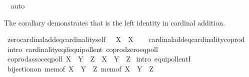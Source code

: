\begin{isabellebody}
\ \ auto%
\endisatagproof
{\isafoldproof}%
%
\isadelimproof
%
\endisadelimproof
%
\begin{isamarkuptext}%
The corallary demonstrates that  is the left identity in cardinal addition.%
\end{isamarkuptext}\isamarkuptrue%
\isamarkupfalse%
\ zero{\isacharunderscore}{\kern0pt}cardinal{\isacharunderscore}{\kern0pt}add{\isacharunderscore}{\kern0pt}eq{\isacharunderscore}{\kern0pt}cardinality{\isacharunderscore}{\kern0pt}self{\isacharcolon}{\kern0pt}\ {\isachardoublequoteopen}{}\ {\isasymoplus}\ X\ {\isacharequal}{\kern0pt}\ {\isacharbar}{\kern0pt}X{\isacharbar}{\kern0pt}{\isachardoublequoteclose}\isanewline
%
\isadelimproof
\ \ %
\endisadelimproof
%
\isatagproof
{}\isamarkupfalse%
\ cardinal{\isacharunderscore}{\kern0pt}add{\isacharunderscore}{\kern0pt}eq{\isacharunderscore}{\kern0pt}cardinality{\isacharunderscore}{\kern0pt}coprod\isanewline
\ \ \isamarkupfalse%
\ {\isacharparenleft}{\kern0pt}intro\ cardinality{\isacharunderscore}{\kern0pt}eq{\isacharunderscore}{\kern0pt}if{\isacharunderscore}{\kern0pt}equipollent\ coprod{\isacharunderscore}{\kern0pt}zero{\isacharunderscore}{\kern0pt}eqpoll{\isacharparenright}{\kern0pt}%
\endisatagproof
{\isafoldproof}%
%
\isadelimproof
\isanewline
%
\endisadelimproof
\isanewline
{}\isamarkupfalse%
\ coprod{\isacharunderscore}{\kern0pt}assoc{\isacharunderscore}{\kern0pt}eqpoll{\isacharcolon}{\kern0pt}\ {\isachardoublequoteopen}{\isacharparenleft}{\kern0pt}X\ {\isasymCoprod}\ Y{\isacharparenright}{\kern0pt}\ {\isasymCoprod}\ Z\ {\isasymapprox}\ X\ {\isasymCoprod}\ {\isacharparenleft}{\kern0pt}Y\ {\isasymCoprod}\ Z{\isacharparenright}{\kern0pt}{\isachardoublequoteclose}\isanewline
%
\isadelimproof
%
\endisadelimproof
%
\isatagproof
{}\isamarkupfalse%
\ {\isacharparenleft}{\kern0pt}intro\ equipollentI{\isacharparenright}{\kern0pt}\isanewline
\ \ \ \isamarkupfalse%
\ {\isachardoublequoteopen}bijection{\isacharunderscore}{\kern0pt}on\ {\isacharparenleft}{\kern0pt}mem{\isacharunderscore}{\kern0pt}of\ {\isacharparenleft}{\kern0pt}{\isacharparenleft}{\kern0pt}X\ {\isasymCoprod}\ Y{\isacharparenright}{\kern0pt}\ {\isasymCoprod}\ Z{\isacharparenright}{\kern0pt}{\isacharparenright}{\kern0pt}\ {\isacharparenleft}{\kern0pt}mem{\isacharunderscore}{\kern0pt}of\ {\isacharparenleft}{\kern0pt}X\ {\isasymCoprod}\ {\isacharparenleft}{\kern0pt}Y\ {\isasymCoprod}\ Z{\isacharparenright}{\kern0pt}{\isacharparenright}{\kern0pt}{\isacharparenright}{\kern0pt}\isanewline

\end{isabellebody}
